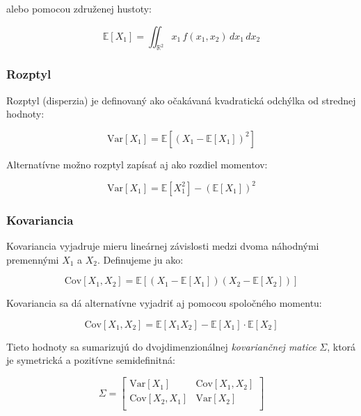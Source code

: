 alebo pomocou združenej hustoty:

\begin{equation}
\mathbb{E}[X_1] = \iint_{\mathbb{R}^2} x_1 \, f(x_1, x_2) \, dx_1 \, dx_2
\end{equation}

\subsubsection{Rozptyl}\label{subsubsec:joint_variance}

Rozptyl (disperzia) je definovaný ako očakávaná kvadratická odchýlka od strednej hodnoty:

\begin{equation}
\mathrm{Var}[X_1] = \mathbb{E}[(X_1 - \mathbb{E}[X_1])^2]
\end{equation}

Alternatívne možno rozptyl zapísať aj ako rozdiel momentov:

\begin{equation}
\mathrm{Var}[X_1] = \mathbb{E}[X_1^2] - (\mathbb{E}[X_1])^2
\end{equation}

\subsubsection{Kovariancia}\label{subsubsec:joint_covariance}

Kovariancia vyjadruje mieru lineárnej závislosti medzi dvoma náhodnými premennými \(X_1\) a \(X_2\). Definujeme ju ako:

\begin{equation}
\mathrm{Cov}[X_1, X_2] = \mathbb{E}[(X_1 - \mathbb{E}[X_1])(X_2 - \mathbb{E}[X_2])]
\end{equation}

Kovariancia sa dá alternatívne vyjadriť aj pomocou spoločného momentu:

\begin{equation}
\mathrm{Cov}[X_1, X_2] = \mathbb{E}[X_1 X_2] - \mathbb{E}[X_1] \cdot \mathbb{E}[X_2]
\end{equation}

Tieto hodnoty sa sumarizujú do dvojdimenzionálnej \textit{kovariančnej matice} \(\Sigma\), ktorá je symetrická a pozitívne semidefinitná:

\begin{equation}
\Sigma = 
\begin{bmatrix}
\mathrm{Var}[X_1] & \mathrm{Cov}[X_1, X_2] \\
\mathrm{Cov}[X_2, X_1] & \mathrm{Var}[X_2] \\
\end{bmatrix}
\end{equation}

